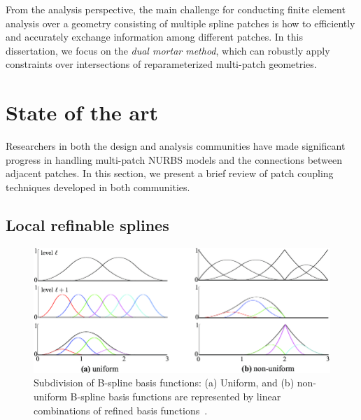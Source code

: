 From the analysis perspective, the main challenge for conducting finite element analysis over a geometry consisting of multiple spline patches is how to efficiently and accurately exchange information among different patches. In this dissertation, we focus on the \textit{dual mortar method}, which can robustly apply constraints over intersections of reparameterized multi-patch geometries.  

\section{State of the art}

Researchers in both the design and analysis communities have made significant progress in handling multi-patch NURBS models and the connections between adjacent patches. In this section, we present a brief review of patch coupling techniques developed in both communities. 
\subsection{Local refinable splines}

\begin{figure}[h]
    \centering
    \includegraphics[width=.8\linewidth]{hierarchical-bsplines}
    \caption{Subdivision of B-spline basis functions: (a) Uniform, and (b) non-uniform B-spline basis functions are represented by linear combinations of refined basis functions~\cite{hennig2016bezier}.}\label{fig:hierarchical-bsplines}
\end{figure}

